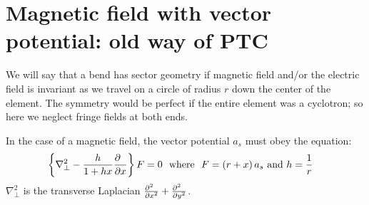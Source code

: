 \documentclass[11pt]{article} %
\begin{document}
\section{Magnetic field with vector potential: old way of PTC}

We will say that a bend has sector geometry if magnetic field and/or the electric field is invariant as we travel on a circle of radius $r$ down the center of the
element. The symmetry would be perfect if the entire element was a cyclotron; so here we neglect fringe fields at both ends.

In the case of a magnetic field, the vector potential $a_s$ must obey the equation:
%
%
\begin{eqnarray}\left\{{{\nabla }_{\perp }^{2}-{h \over 1+hx}{\partial \hphantom{x} \over \partial x}}\right\}F&=0~~{\rm w}{\rm h}{\rm e}{\rm r}{\rm e}~~F=\left({r+x}\right){a}_{s}~{\rm a}{\rm n}{\rm d} ~h=
{1 \over r}\label{eq:maxb}\end{eqnarray}
%
%
%
${\nabla }_{\perp }^{2}$
is the transverse Laplacian %
${{\partial }^{2}\hphantom{x} \over {\partial x}^{2}}+{{\partial }^{2}\hphantom{x} \over {\partial y}^{2}}$.
\end{document}
